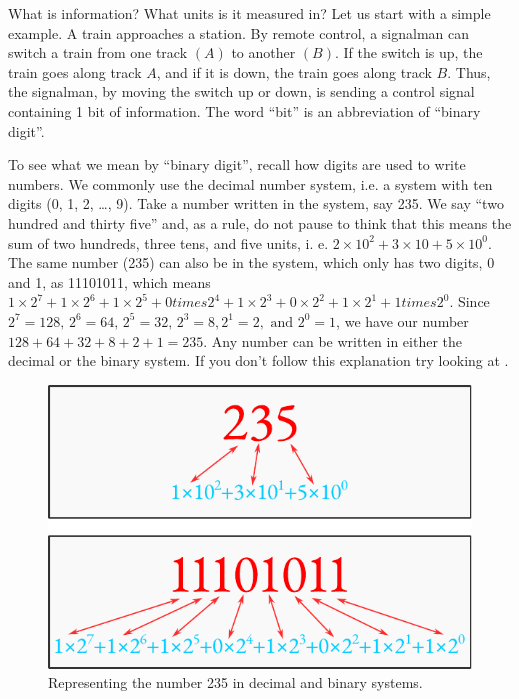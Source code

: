  What is information? What units is it
measured in? Let us start with a simple example. A train approaches
a station. By remote control, a signalman can switch a train from one
track $(A)$ to another $(B)$. If the switch is up, the train goes along track $A$, and if it is down, the train goes along track $B$. Thus, the signalman, by
moving the switch up or down, is sending a control signal containing
1 bit of information. The word ``bit'' is an abbreviation of ``binary digit''.

To see what we mean by ``binary digit'', recall how digits are used to
write numbers. We commonly use the decimal number system, i.e.
a system with ten digits (0, 1, 2, \ldots , 9). Take a number written in the
 system, say 235. We say ``two hundred and thirty five'' and, as
a rule, do not pause to think that this means the sum of two hundreds,
three tens, and five units, i. e. $2 \times 10^{2} + 3 \times 10 + 5 \times 10^{0}$. The same number (235) can also be in the  system, which only has two digits, 0 and 1, as 11101011, which means $1 \times 2^{7} + 1 \times 2^{6} + 1 \times 2^{5} + 0 times 2^{4} + 1 \times 2^{3} + 0 \times 2^{2} + 1 \times 2^{1} + 1 times 2^{0}$. Since $2^{7} = 128, \, 2^{6} = 64, \, 2^{5} = 32, \, 2^{3} = 8, 2^{1} = 2, \,\, \text{and} \,\, 2^{0} = 1$, we have our number $128 + 64 + 32 + 8 + 2 + 1 = 235$. Any number can be written in either the
decimal or the binary system. If you don't follow this explanation try
looking at .

\begin{figure}[!ht]
 \centering
 \includegraphics[width=0.75\linewidth]{figures/binary-conversion.pdf}
\caption{Representing the number 235 in decimal and binary systems.
\label{binary-conversion}}
 \end{figure}

